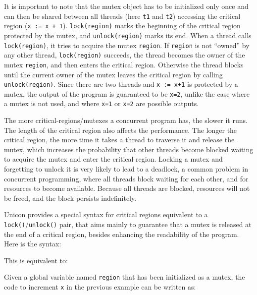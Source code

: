It is important to note that the mutex object has to be initialized only once
and can then be shared between all threads (here \texttt{t1} and \texttt{t2})
accessing the critical region (\texttt{x := x + 1}).  \texttt{lock(region)}
marks the beginning of the critical region protected by the mutex, and
\texttt{unlock(region)} marks its end.  When a thread calls
\texttt{lock(region)}, it tries to acquire the mutex \texttt{region}. If
\texttt{region} is not ``owned'' by any other thread, \texttt{lock(region)}
succeeds, the thread becomes the owner of the mutex \texttt{region}, and then
enters the critical region.  Otherwise the thread blocks until the current owner
of the mutex leaves the critical region by calling \texttt{unlock(region)}.
Since there are two threads and \texttt{x := x+1} is protected by a mutex, the
output of the program is guaranteed to be \texttt{x=2}, unlike the case where a
mutex is not used, and where \texttt{x=1} or \texttt{x=2} are possible outputs.

The more critical-regions/mutexes a concurrent program has, the slower it
runs. The length of the critical region also affects the performance. The longer
the critical region, the more time it takes a thread to traverse it and release
the mutex, which increases the probability that other threads become blocked
waiting to acquire the mutex and enter the critical region. Locking a mutex and
forgetting to unlock it is very likely to lead to a deadlock, a common problem
in concurrent programming, where all threads block waiting for each other, and
for resources to become available.  Because all threads are blocked, resources
will not be freed, and the block persists indefinitely.

Unicon provides a special syntax for critical regions equivalent to a
\texttt{lock()}/\texttt{unlock()} pair, that aims mainly to guarantee that a
mutex is released at the end of a critical region, besides enhancing the
readability of the program.  Here is the syntax:


\noindent
This is equivalent to:


Given a global variable named \texttt{region} that has been initialized as a
mutex, the code to increment \texttt{x} in the previous example can be written
as:


